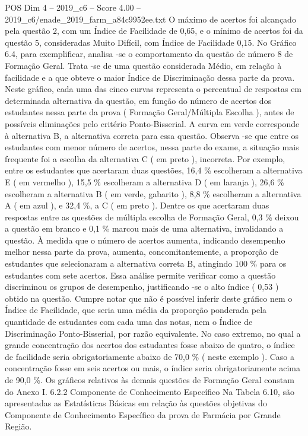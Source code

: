 \begin{textsample}{POS Dim 4 – 2019\_c6 – Score 4.00 – 2019\_c6/enade\_2019\_farm\_a84c9952ee.txt}
O máximo de acertos foi alcançado pela questão 2, com um Índice de Facilidade de 0,65, e o mínimo de acertos foi da questão 5, consideradas Muito Difícil, com Índice de Facilidade 0,15.
No Gráfico 6.4, para exemplificar, analisa -se o comportamento da questão de número 8 de Formação Geral.
Trata -se de uma questão considerada Médio, em relação à facilidade e a que obteve o maior Índice de Discriminação dessa parte da prova.
Neste gráfico, cada uma das cinco curvas representa o percentual de respostas em determinada alternativa da questão, em função do número de acertos dos estudantes nessa parte da prova ( Formação Geral/Múltipla Escolha ), antes de possíveis eliminações pelo critério Ponto-Bisserial.
A curva em verde corresponde à alternativa B, a alternativa correta para essa questão.
Observa -se que entre os estudantes com menor número de acertos, nessa parte do exame, a situação mais frequente foi a escolha da alternativa C ( em preto ), incorreta.
Por exemplo, entre os estudantes que acertaram duas questões, 16,4 \% escolheram a alternativa E ( em vermelho ), 15,5 \% escolheram a alternativa D ( em laranja ), 26,6 \% escolheram a alternativa B ( em verde, gabarito ), 8,8 \% escolheram a alternativa A ( em azul ), e 32,4 \%, a C ( em preto ).
Dentre os que acertaram duas respostas entre as questões de múltipla escolha de Formação Geral, 0,3 \% deixou a questão em branco e 0,1 \% marcou mais de uma alternativa, invalidando a questão.
À medida que o número de acertos aumenta, indicando desempenho melhor nessa parte da prova, aumenta, concomitantemente, a proporção de estudantes que selecionaram a alternativa correta B, atingindo 100 \% para os estudantes com sete acertos.
Essa análise permite verificar como a questão discriminou os grupos de desempenho, justificando -se o alto índice ( 0,53 ) obtido na questão.
Cumpre notar que não é possível inferir deste gráfico nem o Índice de Facilidade, que seria uma média da proporção ponderada pela quantidade de estudantes com cada uma das notas, nem o Índice de Discriminação Ponto-Bisserial, por razão equivalente.
No caso extremo, no qual a grande concentração dos acertos dos estudantes fosse abaixo de quatro, o índice de facilidade seria obrigatoriamente abaixo de 70,0 \% ( neste exemplo ).
Caso a concentração fosse em seis acertos ou mais, o índice seria obrigatoriamente acima de 90,0 \%.
Os gráficos relativos às demais questões de Formação Geral constam do Anexo I. 6.2.2 Componente de Conhecimento Específico Na Tabela 6.10, são apresentadas as Estatísticas Básicas em relação às questões objetivas do Componente de Conhecimento Específico da prova de Farmácia por Grande Região.

\end{textsample}
